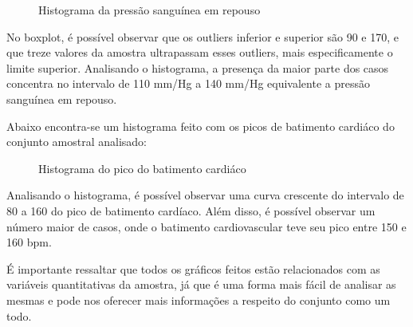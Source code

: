    \begin{figure}[H]
      \centering
      \caption{Histograma da pressão sanguínea em repouso }  
    \end{figure}

    No boxplot, é possível observar que os outliers inferior e superior são 90 e 170, e que treze valores da 
    amostra ultrapassam esses outliers, mais especificamente o limite superior. Analisando o histograma, a 
    presença da maior parte dos casos concentra no intervalo de 110 mm/Hg a 140 mm/Hg equivalente a pressão 
    sanguínea em repouso.

    Abaixo encontra-se um histograma feito com os picos de batimento cardiáco do conjunto amostral analisado:

    \begin{figure}[H]
      \centering
      \caption{Histograma do pico do batimento cardiáco }  
    \end{figure}

    Analisando o histograma, é possível observar uma curva crescente do intervalo de 80 a 160 do pico de batimento 
    cardíaco. Além disso, é possível observar um número maior de casos, onde o batimento cardiovascular teve seu pico 
    entre 150 e 160 bpm.

    É importante ressaltar que todos os gráficos feitos estão relacionados com as variáveis quantitativas da amostra, 
    já que é uma forma mais fácil de analisar as mesmas e pode nos oferecer mais informações a respeito do conjunto como 
    um todo.

    \nocite{sobreboxplot}
    \nocite{sobrehistograma}
